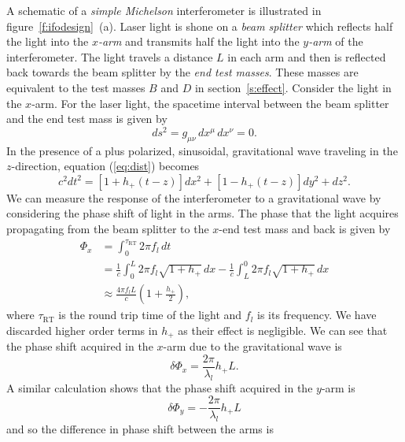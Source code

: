 A schematic of a \emph{simple Michelson} interferometer is illustrated in
figure~\ref{f:ifodesign}~(a).  Laser light is shone on a \emph{beam
splitter} which reflects half the light into the \emph{$x$-arm} and transmits
half the light into the \emph{$y$-arm} of the interferometer. The light
travels a distance $L$ in each arm and then is reflected back towards the beam
splitter by the \emph{end test masses}. These masses are equivalent to the
test masses $B$ and $D$ in section~\ref{s:effect}.  Consider the light in the
$x$-arm. For the laser light, the spacetime interval between the beam splitter
and the end test mass is given by
\begin{equation}
ds^2 = g_{\mu\nu}\, dx^\mu\, dx^\nu = 0.
\label{eq:dist}
\end{equation}
In the presence of a plus polarized, sinusoidal, gravitational wave traveling
in the $z$-direction, equation (\ref{eq:dist}) becomes
\begin{equation}
c^2 dt^2 = \left[1 + h_{+}(t-z)\right] dx^2 + \left[1 - h_{+}(t-z)\right] dy^2 + dz^2.
\end{equation}
We can measure the response of the interferometer to a gravitational wave by
considering the phase shift of light in the arms. The phase that the light
acquires propagating from the beam splitter to the $x$-end test mass and
back is given by\cite{Saulson:1994}
\begin{equation}
\begin{split}
\Phi_x &= \int_0^{\tau_\mathrm{RT}} 2\pi f_l\, dt \\
&= \frac{1}{c} \int_0^L 2\pi f_l \sqrt{1 + h_{+}}\,dx -
\frac{1}{c} \int_L^0 2\pi f_l \sqrt{1 + h_{+}}\,dx \\
&\approx \frac{4\pi f_l L}{c} \left(1 + \frac{h_{+}}{2}\right),
\end{split}
\end{equation}
where $\tau_\mathrm{RT}$ is the round trip time of the light and $f_l$ is
its frequency. We have discarded higher order terms in $h_+$ as their effect
is negligible.  We can see that the phase shift acquired in the $x$-arm due to the
gravitational wave is
\begin{equation}
\delta \Phi_x = \frac{2\pi}{\lambda_l} h_{+} L.
\end{equation}
A similar calculation shows that the phase shift acquired in the $y$-arm is
\begin{equation}
\delta \Phi_y = - \frac{2\pi}{\lambda_l} h_{+} L
\end{equation}
and so the difference in phase shift between the arms is
